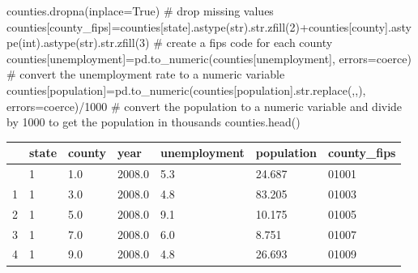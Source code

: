 \documentclass[
  letterpaper,
  DIV=11,
  numbers=noendperiod]{scrreprt}
\newenvironment{Shaded}{\begin{snugshade}}{\end{snugshade}}
\newcommand{\BuiltInTok}[1]{\textcolor[rgb]{0.00,0.23,0.31}{#1}}
\newcommand{\CommentTok}[1]{\textcolor[rgb]{0.37,0.37,0.37}{#1}}
\newcommand{\DecValTok}[1]{\textcolor[rgb]{0.68,0.00,0.00}{#1}}
\newcommand{\NormalTok}[1]{\textcolor[rgb]{0.00,0.23,0.31}{#1}}
\newcommand{\OperatorTok}[1]{\textcolor[rgb]{0.37,0.37,0.37}{#1}}
\newcommand{\StringTok}[1]{\textcolor[rgb]{0.13,0.47,0.30}{#1}}
\newcommand{\VariableTok}[1]{\textcolor[rgb]{0.07,0.07,0.07}{#1}}
\begin{document}
\begin{Shaded}
\begin{Highlighting}[]
\NormalTok{counties.dropna(inplace}\OperatorTok{=}\VariableTok{True}\NormalTok{) }\CommentTok{\# drop missing values}
\NormalTok{counties[}\StringTok{\textquotesingle{}county\_fips\textquotesingle{}}\NormalTok{]}\OperatorTok{=}\NormalTok{counties[}\StringTok{\textquotesingle{}state\textquotesingle{}}\NormalTok{].astype(}\BuiltInTok{str}\NormalTok{).}\BuiltInTok{str}\NormalTok{.zfill(}\DecValTok{2}\NormalTok{)}\OperatorTok{+}\NormalTok{counties[}\StringTok{\textquotesingle{}county\textquotesingle{}}\NormalTok{].astype(}\BuiltInTok{int}\NormalTok{).astype(}\BuiltInTok{str}\NormalTok{).}\BuiltInTok{str}\NormalTok{.zfill(}\DecValTok{3}\NormalTok{) }\CommentTok{\# create a fips code for each county}
\NormalTok{counties[}\StringTok{\textquotesingle{}unemployment\textquotesingle{}}\NormalTok{]}\OperatorTok{=}\NormalTok{pd.to\_numeric(counties[}\StringTok{\textquotesingle{}unemployment\textquotesingle{}}\NormalTok{], errors}\OperatorTok{=}\StringTok{\textquotesingle{}coerce\textquotesingle{}}\NormalTok{) }\CommentTok{\# convert the unemployment rate to a numeric variable}
\NormalTok{counties[}\StringTok{\textquotesingle{}population\textquotesingle{}}\NormalTok{]}\OperatorTok{=}\NormalTok{pd.to\_numeric(counties[}\StringTok{\textquotesingle{}population\textquotesingle{}}\NormalTok{].}\BuiltInTok{str}\NormalTok{.replace(}\StringTok{\textquotesingle{},\textquotesingle{}}\NormalTok{,}\StringTok{\textquotesingle{}\textquotesingle{}}\NormalTok{), errors}\OperatorTok{=}\StringTok{\textquotesingle{}coerce\textquotesingle{}}\NormalTok{)}\OperatorTok{/}\DecValTok{1000} \CommentTok{\# convert the population to a numeric variable and divide by 1000 to get the population in thousands}
\NormalTok{counties.head()}
\end{Highlighting}
\end{Shaded}

\begin{longtable}[]{@{}lllllll@{}}
\toprule\noalign{}
& state & county & year & unemployment & population & county\_fips \\
\midrule\noalign{}
\endhead
\bottomrule\noalign{}
\endlastfoot
0 & 1 & 1.0 & 2008.0 & 5.3 & 24.687 & 01001 \\
1 & 1 & 3.0 & 2008.0 & 4.8 & 83.205 & 01003 \\
2 & 1 & 5.0 & 2008.0 & 9.1 & 10.175 & 01005 \\
3 & 1 & 7.0 & 2008.0 & 6.0 & 8.751 & 01007 \\
4 & 1 & 9.0 & 2008.0 & 4.8 & 26.693 & 01009 \\
\end{longtable}
\end{document}
